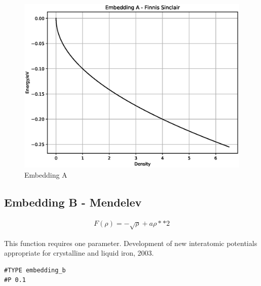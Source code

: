 \documentclass[12pt,twoside]{manual}
\begin{document}
\begin{appendices}
\FloatBarrier
\begin{figure}[h]
  \begin{center}
    \includegraphics[scale=0.5]{img/plots/embedding_a.eps}
    \caption{Embedding A}
    \label{graph:graph1}
  \end{center}
\end{figure}
\FloatBarrier








\subsection{Embedding B - Mendelev}

\begin{equation}
\begin{split}
F(\rho) = -\sqrt{\rho} + a \rho**2
\end{split}
\label{eq:mendelevEmbedding}
\end{equation}

This function requires one parameter. 
Development of new interatomic potentials appropriate for crystalline and liquid iron, 2003.

\begin{lstlisting}[style=pseudocode,caption={Embedding B}]
#TYPE embedding_b
#P 0.1
\end{lstlisting}


\end{appendices}
\end{document}
